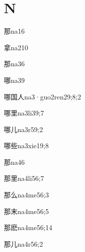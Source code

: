 \section*{N}

\begin{verbete}{那}{na1}{6}
\end{verbete}
\begin{verbete}{拿}{na2}{10}
\end{verbete}
\begin{verbete}{那}{na3}{6}
\end{verbete}
\begin{verbete}{哪}{na3}{9}
\end{verbete}
\begin{verbete}{哪国人}{na3·guo2ren2}{9;8;2}
\end{verbete}
\begin{verbete}{哪里}{na3li3}{9;7}
\end{verbete}
\begin{verbete}{哪儿}{na3r5}{9;2}
\end{verbete}
\begin{verbete}{哪些}{na3xie1}{9;8}
\end{verbete}
\begin{verbete}{那}{na4}{6}
\end{verbete}
\begin{verbete}{那里}{na4li5}{6;7}
\end{verbete}
\begin{verbete}{那么}{na4me5}{6;3}
\end{verbete}
\begin{verbete}{那末}{na4me5}{6;5}
\end{verbete}
\begin{verbete}{那麽}{na4me5}{6;14}
\end{verbete}
\begin{verbete}{那儿}{na4r5}{6;2}
\end{verbete}

